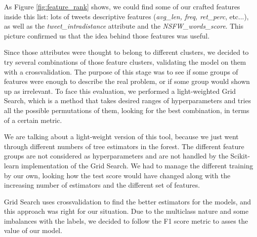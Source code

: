 As Figure \ref{fig:feature_rank} shows, we could find some of our crafted features inside this list: lots of tweets descriptive features (\textit{avg\_len, freq, ret\_perc}, etc...), as well as the \textit{tweet\_intradistance} attribute and the \textit{NSFW\_words\_score}.
This picture confirmed us that the idea behind those features was useful.

Since those attributes were thought to belong to different clusters, we decided to try several combinations of those feature clusters, validating the model on them with a crossvalidation. The purpose of this stage was to see if some groups of features were enough to describe the real problem, or if some group would shown up as irrelevant.
To face this evaluation, we performed a light-weighted Grid Search, which is a method that takes desired ranges of hyperparameters and tries all the possible permutations of them, looking for the best combination, in terms of a certain metric.

We are talking about a light-weight version of this tool, because we just went through different numbers of tree estimators in the forest. The different feature groups are not considered as hyperparameters and are not handled by the Scikit-learn implementation of the Grid Search.
We had to manage the different training by our own, looking how the test score would have changed along with the increasing number of estimators and the different set of features.

Grid Search uses crossvalidation to find the better estimators for the models, and this approach was right for our situation.
Due to the multiclass nature and some imbalances with the labels, we decided to follow the F1 score metric to asses the value of our model.

